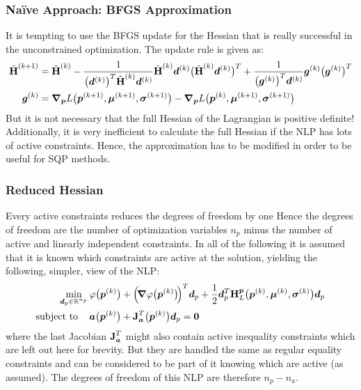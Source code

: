 			\subsubsection{Na{\"i}ve Approach: BFGS Approximation}
				It is tempting to use the BFGS update for the Hessian that is really successful in the unconstrained optimization. The update rule is given as:
				\begin{align*}
					\tilde{\bm{\mathrm{H}}}^{(k + 1)} & = \tilde{\bm{\mathrm{H}}}^{(k)}
					- \frac{1}{\big(\bm{d}^{(k)}\big)^T \tilde{\bm{\mathrm{H}}}^{(k)} \bm{d}^{(k)}} \tilde{\bm{\mathrm{H}}}^{(k)} \bm{d}^{(k)} \big(\tilde{\bm{\mathrm{H}}}^{(k)} \bm{d}^{(k)}\big)^T
					+ \frac{1}{\big(\bm{g}^{(k)}\big)^T \bm{d}^{(k)}} \bm{g}^{(k)} \big(\bm{g}^{(k)}\big)^T                                                                                                                   \\
					\bm{g}^{(k)}             & = \grad_{\bm{p}}L\big(\bm{p}^{(k + 1)}, \bm{\mu}^{(k + 1)}, \bm{\sigma}^{(k + 1)}\big) - \grad_{\bm{p}}L\big(\bm{p}^{(k)}, \bm{\mu}^{(k + 1)}, \bm{\sigma}^{(k + 1)}\big)
				\end{align*}
				But it is not necessary that the full Hessian of the Lagrangian is positive definite! Additionally, it is very inefficient to calculate the full Hessian if the NLP has lots of active constraints. Hence, the approximation has to be modified in order to be useful for SQP methods.

			\subsubsection{Reduced Hessian} %
				Every active constraints reduces the degrees of freedom by one Hence the degrees of freedom are the number of optimization variables \(n_p\) minus the number of active and linearly independent constraints. In all of the following it is assumed that it is known which constraints are active at the solution, yielding the following, simpler, view of the NLP:
				\begin{align}
					\min_{\bm{d}_p \in \mathbb{R}^{n_p}} & \, \varphi\big(\bm{p}^{(k)}\big) + \Big(\!\grad{\varphi}\big(\bm{p}^{(k)}\big)\!\Big)^T \bm{d}_p + \frac{1}{2} \bm{d}_p^T \bm{\mathrm{H}}_L^{\bm{p}}\big(\bm{p}^{(k)}, \bm{\mu}^{(k)}, \bm{\sigma}^{(k)}\big) \bm{d}_p \\
					\mathrm{subject~to}\quad      & \,
					\begin{alignedat}[t]{2}
						\bm{a}\big(\bm{p}^{(k)}\big) + \bm{\mathrm{J}}_{\bm{a}}^T\big(\bm{p}^{(k)}\big) \bm{d}_p &= \bm{0}
					\end{alignedat}  \label{eq:activeQp}
				\end{align}
				where the last Jacobian \( \bm{\mathrm{J}}_{\bm{a}}^T \) might also contain active inequality constraints which are left out here for brevity. But they are handled the same as regular equality constraints and can be considered to be part of it knowing which are active (as assumed). The degrees of freedom of this NLP are therefore \( n_p - n_a \).

